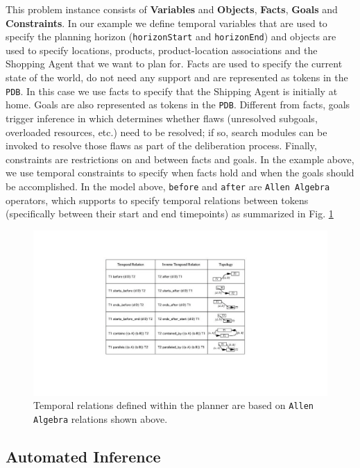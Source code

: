 This problem instance consists of \textbf{Variables} and
\textbf{Objects}, \textbf{Facts}, \textbf{Goals} and
\textbf{Constraints}. In our example we define temporal variables that
are used to specify the planning horizon (\texttt{horizonStart} and
\texttt{horizonEnd}) and objects are used to specify locations,
products, product-location associations and the Shopping Agent that we
want to plan for. Facts are used to specify the current state of the
world, do not need any support and are represented as tokens in the
\texttt{PDB}. In this case we use facts to specify that the Shipping
Agent is initially at home. Goals are also represented as tokens in
the \texttt{PDB}. Different from facts, goals trigger inference in \eu
which determines whether flaws (unresolved subgoals, overloaded
resources, etc.) need to be resolved; if so, search modules can be
invoked to resolve those flaws as part of the deliberation
process. Finally, constraints are restrictions on and between facts 
and goals. In the example above, we use temporal constraints to
specify when facts hold and when the goals should be
accomplished. In the model above, \texttt{before} and \texttt{after} 
are \texttt{Allen Algebra} \cite{allen84} operators, which \eu supports to specify
temporal relations between tokens (specifically between their start and end timepoints)
as summarized in Fig. \ref{fig:allen-algebra} 

\begin{figure}[!htb]
\centering
\includegraphics[scale=0.3]{figs/Allen-algebra.pdf}
\caption{\small Temporal relations defined within the planner are
  based on \texttt{Allen Algebra} \cite{allen84} relations shown
  above.}
\label{fig:allen-algebra}
\end{figure}


\subsection{Automated Inference}
\label{sec:europa:inference}

